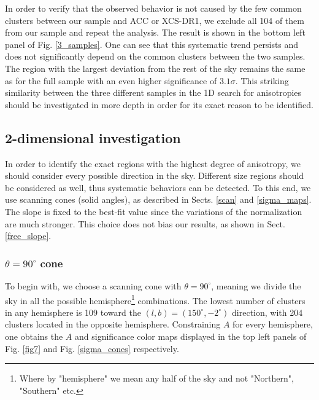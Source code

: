\documentclass{aa}   %
\begin{document}
In order to verify that the observed behavior is not caused by the few common clusters between our sample and ACC or XCS-DR1, we exclude all 104 of them from our sample and repeat the analysis. The result is shown in the bottom left panel of Fig. \ref{3_samples}. One can see that this systematic trend persists and does not significantly depend on the common clusters between the two samples. The region with the largest deviation from the rest of the sky remains the same as for the full sample with an even higher significance of $3.1\sigma$. This striking similarity between the three different samples in the 1D search for anisotropies should be investigated in more depth in order for its exact reason to be identified.


\subsection{2-dimensional investigation} \label{2d_analysis}

In order to identify the exact regions with the highest degree of anisotropy, we should consider every possible direction in the sky. Different size regions should be considered as well, thus systematic behaviors can be detected. To this end, we use scanning cones (solid angles), as described in Sects. \ref{scan} and \ref{sigma_maps}. The slope is fixed to the best-fit value since the variations of the normalization are much stronger. This choice does not bias our results, as shown in Sect. \ref{free_slope}.

\subsubsection{$\theta=90^{\circ}$ cone}

To begin with, we choose a scanning cone with $\theta=90^{\circ}$, meaning we divide the sky in all the possible hemisphere\footnote{Where by "hemisphere" we mean any half of the sky and not "Northern", "Southern" etc.} combinations. The lowest number of clusters in any hemisphere is 109 toward the $(l,b)=(150^{\circ}, -2^{\circ})$ direction, with 204 clusters located in the opposite hemisphere. Constraining $A$ for every hemisphere, one obtains the $A$ and significance color maps displayed in the top left panels of Fig. \ref{fig7} and Fig. \ref{sigma_cones} respectively. 
\end{document}
